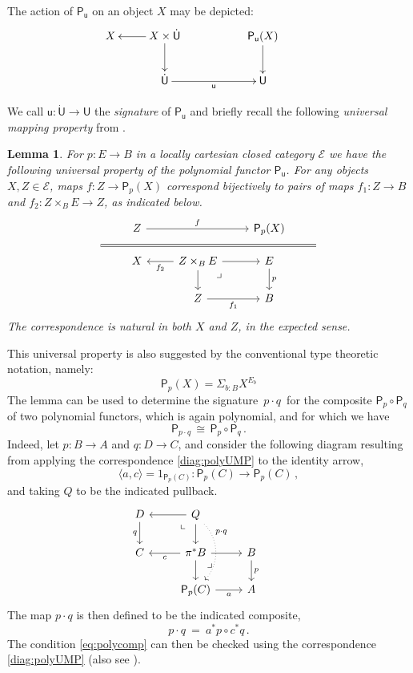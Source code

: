 \documentclass[12pt,reqno]{amsart}
\newcommand{\EE}{\ensuremath{\mathcal{E}}}
\newcommand{\alg}[1]{\ensuremath{\mathsf{#1}}}
\renewcommand{\to}{\ensuremath{\rightarrow}}
\renewcommand{\t}{\ensuremath{\mathsf{u}}}
\newcommand{\T}{\ensuremath{\mathsf{U}}}
\newcommand{\TT}{\ensuremath{\dot{\mathsf{U}}}}
\newcommand{\tT}{\ensuremath{{\t}:\TT\to\T}}
\newcommand{\pbcorner}{\arrow[dr,phantom,"\lrcorner" very near start, shift right=.5ex]} %
\newcommand{\pbcornerright}{\arrow[dl,phantom,"\llcorner" very near start, shift left=.5ex]} %
\newtheorem{lemma}[theorem]{Lemma}
\theoremstyle{remark}
\theoremstyle{definition}
\begin{document}
The action of $\alg{P}_\t$ on an object $X$ may be depicted:
\begin{equation*}
\xymatrix{
 X & \ar[l] X\times \TT \ar[d] && \alg{P}_\t(X) \ar[d] \\
	& \TT \ar[rr]_{\t} && \T 
 }\qquad\quad
 \end{equation*}

We call $\tT$ the \emph{signature} of $\alg{P}_\t$ and briefly recall the following \emph{universal mapping property} from \cite{awodey:NM}.

\begin{lemma}
 For $p: E \to B$ in a locally cartesian closed category $\EE$ we have the following universal property of the polynomial functor $\alg{P}_\t$. For any objects $X, Z \in \EE$, maps $f : Z \to \alg{P}_p (X)$ correspond bijectively to pairs of maps $f_1 : Z \to B$ and $f_2 : Z\times_B E \to Z$, as indicated below.
\begin{equation}\label{diag:polyUMP}
\begin{tikzcd}
& Z \ar[rr,"f"] && \alg{P}_p (X) & \\[-5ex]
\strut \ar[rrrr, equal] &&&& \strut\\[-5ex]
&X & \ar[l,"f_2"] Z\times_B E \ar[d] \ar[r] \pbcorner & E \ar[d, "p"] &\\
&& Z \ar[r,swap,"f_1"] & B &
\end{tikzcd}
\end{equation}
The correspondence is natural in both $X$ and $Z$, in the expected sense.
\end{lemma}

This universal property is also suggested by the conventional type theoretic notation, namely: $$\alg{P}_p (X) = \Sigma_{b:B} X^{E_b}$$
The lemma can be used to determine the signature $\, p\cdot q\, $ for the composite $\alg{P}_p \circ \alg{P}_q$ of two polynomial functors, which is again polynomial, and for which we have
\begin{equation}\label{eq:polycomp}
\alg{P}_{p\cdot q}\, \cong\, \alg{P}_p \circ \alg{P}_q\,.
\end{equation}
Indeed, let $p : B \to A$ and $q : D \to C$, and consider the following diagram resulting from applying the correspondence \eqref{diag:polyUMP} to the identity arrow,
\[
\langle a, c\rangle = 1_{\alg{P}_p(C)} : \alg{P}_p(C) \to \alg{P}_p(C)\,,
\]
and taking $Q$ to be the indicated pullback.
%
\begin{equation}\label{diag:polyUMP2}
\begin{tikzcd}
D \ar[d,swap,"q"] & \ar[l] Q \ar[d] \pbcornerright  \ar[dd, dotted, bend left = 10ex ,near start, "{p\cdot q}"]& & \\
 C  & \ar[l,"c"] \pi^*B \ar[d] \ar[r] \pbcorner & B \ar[d,"p"] \\
&  \alg{P}_p(C) \ar[r,swap,"a"] & A
\end{tikzcd}
\end{equation}
The map $p\cdot q$ is then defined to be the indicated composite,
\[
p\cdot q\ =\ a^*p \circ c^*q\,.
\]
The condition \eqref{eq:polycomp} can then be checked using the correspondence \eqref{diag:polyUMP} (also see \cite{GambinoKoch:2013}).
\end{document}
